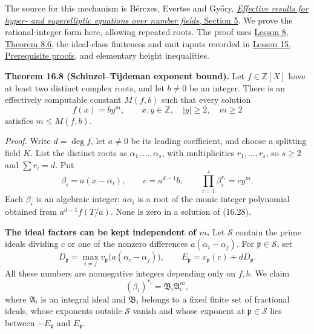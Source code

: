 \documentclass[
  11pt,
  a4paper,
]{article}
\begin{document}
The source for this mechanism is Bérczes, Evertse and Győry,
\href{https://arxiv.org/abs/1301.7168}{\emph{Effective results for
hyper- and superelliptic equations over number fields}, Section 5}. We
prove the rational-integer form here, allowing repeated roots. The proof
uses \href{https://kokunoyumeto.github.io/open-math-courses-public/courses/TR-BAKER/TR-BAKER-08.html}{Lesson 8, Theorem 8.6}, the ideal-class
finiteness and unit inputs recorded in
\href{https://kokunoyumeto.github.io/open-math-courses-public/courses/TR-BAKER/TR-BAKER-15.html\#prerequisite-proofs}{Lesson 15, Prerequisite
proofs}, and elementary height inequalities.

\textbf{Theorem 16.8 (Schinzel--Tijdeman exponent bound).} Let
\(f\in\mathbb Z[X]\) have at least two distinct complex roots, and let
\(b\ne0\) be an integer. There is an effectively computable constant
\(M(f,b)\) such that every solution \[
 f(x)=b y^m,\qquad x,y\in\mathbb Z,\quad |y|\geq2,\quad m\geq2
 \tag{16.28}
\] satisfies \(m\leq M(f,b)\).

\emph{Proof.} Write \(d=\deg f\), let \(a\ne0\) be its leading
coefficient, and choose a splitting field \(K\). List the distinct roots
as \(\alpha_1,\ldots,\alpha_s\), with multiplicities \(r_1,\ldots,r_s\),
so \(s\geq2\) and \(\sum r_i=d\). Put \[
 \beta_i=a(x-\alpha_i),\qquad
 c=a^{d-1}b,\qquad
 \prod_{i=1}^s\beta_i^{r_i}=c y^m.
 \tag{16.29}
\] Each \(\beta_i\) is an algebraic integer: \(a\alpha_i\) is a root of
the monic integer polynomial obtained from \(a^{d-1}f(T/a)\). None is
zero in a solution of (16.28).

\textbf{The ideal factors can be kept independent of \(m\).} Let
\(\mathcal S\) contain the prime ideals dividing \(c\) or one of the
nonzero differences \(a(\alpha_i-\alpha_j)\). For
\(\mathfrak p\in\mathcal S\), set \[
 D_{\mathfrak p}=
 \max_{i\ne j}v_{\mathfrak p}\bigl(a(\alpha_i-\alpha_j)\bigr),
 \qquad
 E_{\mathfrak p}=v_{\mathfrak p}(c)+dD_{\mathfrak p}.
 \tag{16.30}
\] All these numbers are nonnegative integers depending only on \(f,b\).
We claim \[
 (\beta_i)^{r_i}=\mathfrak B_i\mathfrak A_i^m,
 \tag{16.31}
\] where \(\mathfrak A_i\) is an integral ideal and \(\mathfrak B_i\)
belongs to a fixed finite set of fractional ideals, whose exponents
outside \(\mathcal S\) vanish and whose exponent at
\(\mathfrak p\in\mathcal S\) lies between \(-E_{\mathfrak p}\) and
\(E_{\mathfrak p}\).
\end{document}
